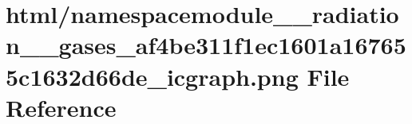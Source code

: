 \hypertarget{namespacemodule____radiation____gases__af4be311f1ec1601a167655c1632d66de__icgraph_8png}{}\section{html/namespacemodule\+\_\+\+\_\+radiation\+\_\+\+\_\+gases\+\_\+af4be311f1ec1601a167655c1632d66de\+\_\+icgraph.png File Reference}
\label{namespacemodule____radiation____gases__af4be311f1ec1601a167655c1632d66de__icgraph_8png}
